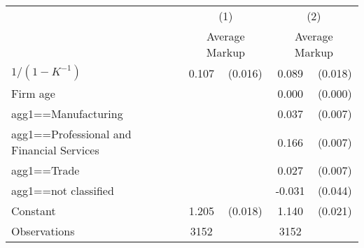 \begin{tabular}{l*{2}{cc}}
\hline\hline
                    &\multicolumn{2}{c}{(1)}  &\multicolumn{2}{c}{(2)}  \\
                    &\multicolumn{2}{c}{Average Markup}&\multicolumn{2}{c}{Average Markup}\\
\hline
$1/(1-K^{-1})$      &       0.107&     (0.016)&       0.089&     (0.018)\\
Firm age            &            &            &       0.000&     (0.000)\\
agg1==Manufacturing &            &            &       0.037&     (0.007)\\
agg1==Professional and Financial Services&            &            &       0.166&     (0.007)\\
agg1==Trade         &            &            &       0.027&     (0.007)\\
agg1==not classified&            &            &      -0.031&     (0.044)\\
Constant            &       1.205&     (0.018)&       1.140&     (0.021)\\
\hline
Observations        &        3152&            &        3152&            \\
\hline\hline
\end{tabular}
